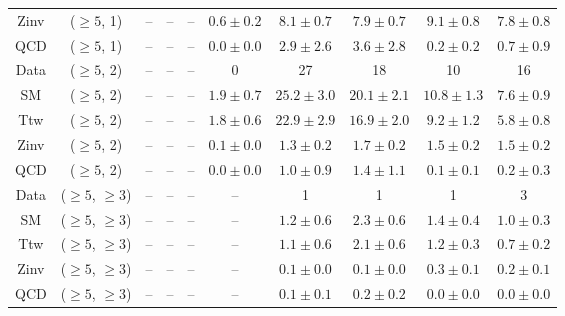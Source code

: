 \begin{table}[h!]
{\begin{tabular}{cccccccccc}
	Zinv & ($\ge5$, 1) & -- & -- & -- & $0.6\pm 0.2$ & $8.1\pm 0.7$ & $7.9\pm 0.7$ & $9.1\pm 0.8$ & $7.8\pm 0.8$ \\[0.5ex] 
	QCD & ($\ge5$, 1) & -- & -- & -- & $0.0\pm 0.0$ & $2.9\pm 2.6$ & $3.6\pm 2.8$ & $0.2\pm 0.2$ & $0.7\pm 0.9$ \\[0.5ex] 
	Data & ($\ge5$, 2) & -- & -- & -- & 0 & 27 & 18 & 10 & 16 \\[0.5ex] 
	SM & ($\ge5$, 2) & -- & -- & -- & $1.9\pm 0.7$ & $25.2\pm 3.0$ & $20.1\pm 2.1$ & $10.8\pm 1.3$ & $7.6\pm 0.9$ \\[0.5ex] 
	Ttw & ($\ge5$, 2) & -- & -- & -- & $1.8\pm 0.6$ & $22.9\pm 2.9$ & $16.9\pm 2.0$ & $9.2\pm 1.2$ & $5.8\pm 0.8$ \\[0.5ex] 
	Zinv & ($\ge5$, 2) & -- & -- & -- & $0.1\pm 0.0$ & $1.3\pm 0.2$ & $1.7\pm 0.2$ & $1.5\pm 0.2$ & $1.5\pm 0.2$ \\[0.5ex] 
	QCD & ($\ge5$, 2) & -- & -- & -- & $0.0\pm 0.0$ & $1.0\pm 0.9$ & $1.4\pm 1.1$ & $0.1\pm 0.1$ & $0.2\pm 0.3$ \\[0.5ex] 
	Data & ($\ge5$, $\ge3$) & -- & -- & -- & -- & 1 & 1 & 1 & 3 \\[0.5ex] 
	SM & ($\ge5$, $\ge3$) & -- & -- & -- & -- & $1.2\pm 0.6$ & $2.3\pm 0.6$ & $1.4\pm 0.4$ & $1.0\pm 0.3$ \\[0.5ex] 
	Ttw & ($\ge5$, $\ge3$) & -- & -- & -- & -- & $1.1\pm 0.6$ & $2.1\pm 0.6$ & $1.2\pm 0.3$ & $0.7\pm 0.2$ \\[0.5ex] 
	Zinv & ($\ge5$, $\ge3$) & -- & -- & -- & -- & $0.1\pm 0.0$ & $0.1\pm 0.0$ & $0.3\pm 0.1$ & $0.2\pm 0.1$ \\[0.5ex] 
	QCD & ($\ge5$, $\ge3$) & -- & -- & -- & -- & $0.1\pm 0.1$ & $0.2\pm 0.2$ & $0.0\pm 0.0$ & $0.0\pm 0.0$ \\[0.5ex] 
	\hline
	\hline
\end{tabular}}
\end{table}
